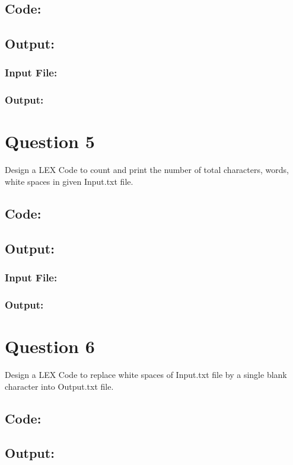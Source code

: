 \documentclass{article}
\begin{document}
\subsection*{Code:}

\newpage
\subsection*{Output:}
\subsubsection*{Input File:}

\subsubsection*{Output:}


\newpage
\section*{Question 5}
Design a LEX Code to count and print the number of total 
characters, words, white spaces in given Input.txt file.
\subsection*{Code:}

\subsection*{Output:}
\subsubsection*{Input File:}

\subsubsection*{Output:}


\newpage
\section*{Question 6}
Design a LEX Code to replace white spaces of Input.txt
file by a single blank character into Output.txt file.
\subsection*{Code:}

\subsection*{Output:}
\end{document}
